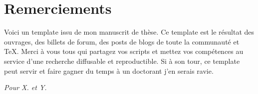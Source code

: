 \chapter*{Remerciements}

Voici un template issu de mon manuscrit de thèse. Ce template est le résultat des ouvrages, des billets de forum, des posts de blogs de toute la communauté \R{} et \TeX{}. Merci à vous tous qui partagez vos scripts et mettez vos compétences au service d'une recherche diffusable et reproductible.  Si à son tour, ce template peut servir et faire gagner du temps à un doctorant j'en serais ravie. 

\begin{vcenterpage}
\begin{flushright}
\textit{Pour X. et Y.}
\end{flushright}
\end{vcenterpage}